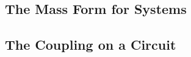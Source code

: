 \subsection{The Mass Form for Systems}
\label{sec:systems-mass}

\subsection{The Coupling on a Circuit}
\label{sec:systems-coupling}

